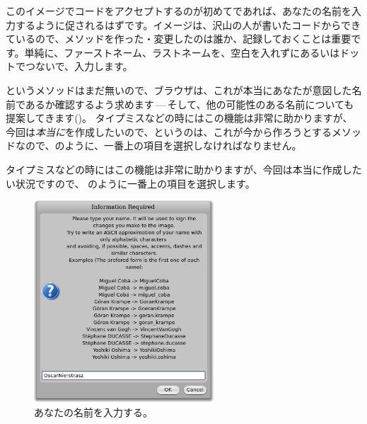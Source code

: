\documentclass[a4paper,10pt,twoside]{book}
\begin{document}
このイメージでコードをアクセプトするのが初めてであれば、あなたの名前を入力するように促されるはずです。イメージは、沢山の人が書いたコードからできているので、メソッドを作った・変更したのは誰か、記録しておくことは重要です。単純に、ファーストネーム、ラストネームを、空白を入れずにあるいはドットでつないで、入力します。


というメソッドはまだ無いので、ブラウザは、これが本当にあなたが意図した名前であるか確認するよう求めます\,---\,そして、他の可能性のある名前についても提案してきます()。
タイプミスなどの時にはこの機能は非常に助かりますが、今回は\emph{本当に}を作成したいので、というのは、これが今から作ろうとするメソッドなので、のように、一番上の項目を選択しなければなりません。

タイプミスなどの時にはこの機能は非常に助かりますが、今回は本当に作成したい状況ですので、 のように一番上の項目を選択します。


\begin{figure}[htb]
\centerline {\includegraphics[width=0.6\textwidth]{name}}
\caption{あなたの名前を入力する。}
\end{figure}
\end{document}
